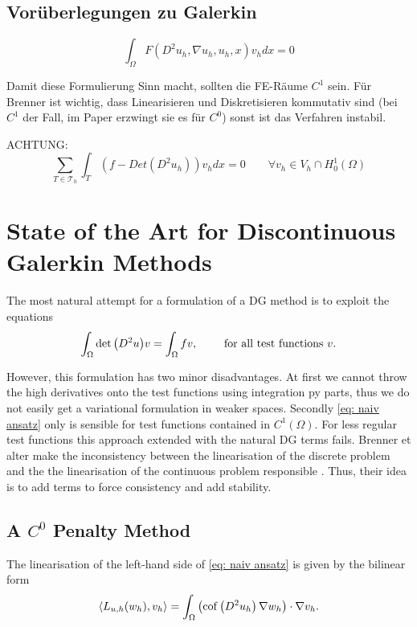 \subsection*{Vorüberlegungen zu Galerkin}

\[
\int_\Omega F(D^2 u_h, \nabla u_h, u_h, x)v_h dx = 0
\]

Damit diese Formulierung Sinn macht, sollten die FE-Räume $C^1$ sein.
Für Brenner ist wichtig, dass Linearisieren und Diskretisieren kommutativ sind (bei $C^1$ der Fall, im Paper \cite{Brenner2012} erzwingt sie es für $C^0$) sonst ist das Verfahren instabil.

ACHTUNG:
\[
\sum_{T \in \mathcal{T}_h} \int_T(f-Det(D^2 u_h))v_h dx = 0 \qquad \forall v_h \in V_h \cap H_0^1(\Omega)
\]



\section{State of the Art for Discontinuous Galerkin Methods} %

The most natural attempt for a formulation of a DG method is to exploit the equations
\begin{align}
	\int_{\Omega} \det{\left(D^2 u\right)} v = \int_\Omega fv, \qquad \text{ for all test functions } v. \label{eq: naiv ansatz}
\end{align}

However, this formulation has two minor disadvantages. 
At first we cannot throw the high derivatives onto the test functions using integration py parts, thus we do not easily get a variational formulation in weaker spaces. Secondly \eqref{eq: naiv ansatz} only is sensible for test functions contained in $C^1(\Omega)$. For less regular test functions this approach extended with the natural DG terms fails. Brenner et alter make the inconsistency between the linearisation of the discrete problem and the the linearisation of the continuous problem responsible \cite{BGN+2011}. Thus, their idea is to add terms to force consistency and add stability.

\subsection{A $C^0$ Penalty Method }

The linearisation of the left-hand side of \eqref{eq: naiv ansatz} is given by the bilinear form
\begin{align}
\langle L_{u,h}(w_h),v_h\rangle = \int_{\Omega} \left( \operatorname{cof} \left( D^2 u_h \right) \nabla w_h\right) \cdot \nabla v_h. \label{linearOperator}
\end{align}

